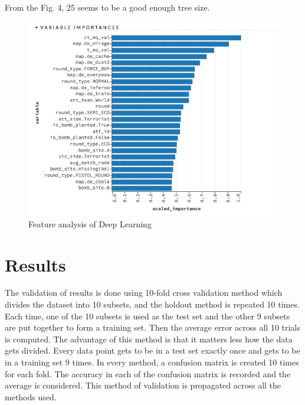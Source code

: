 \documentclass[conference]{IEEEtran}
\begin{document}
\begin{itemize}
 From the Fig. 4, 25 seems to be a good enough tree size.

\begin{figure}[!t]
\includegraphics[width=\linewidth]{images/tab3.png}
\caption{Feature analysis of Deep Learning}
\end{figure}

\end{itemize}

\section{Results}

The validation of results is done using 10-fold cross validation method which divides the dataset into 10 subsets, and the holdout method is repeated 10 times. Each time, one of the 10 subsets is used as the test set and the other 9 subsets are put together to form a training set. Then the average error across all 10 trials is computed. The advantage of this method is that it matters less how the data gets divided. Every data point gets to be in a test set exactly once and gets to be in a training set 9 times. In every method, a confusion matrix is created 10 times for each fold. The accuracy in each of the confusion matrix is recorded and the average is considered. This method of validation is propagated across all the methods used.
\end{document}

